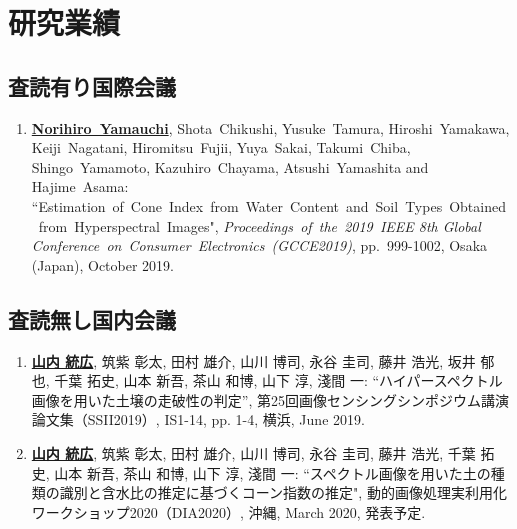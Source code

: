 \chapter*{研究業績}
\thispagestyle{empty}
\lhead[研究業績]{}
\label{achive}

\newpage


\section*{査読有り国際会議}
\mbox{}

\begin{enumerate}

\item
\underline{\textbf{Norihiro~Yamauchi}}, Shota~Chikushi, Yusuke~Tamura, Hiroshi~Yamakawa, Keiji~Nagatani, Hiromitsu~Fujii, Yuya~Sakai, Takumi~Chiba, Shingo~Yamamoto, Kazuhiro~Chayama, Atsushi~Yamashita and Hajime~Asama: ``Estimation~of~Cone~Index~from~Water~Content~and~Soil~Types~Obtained~from~Hyperspectral~Images", {\it Proceedings~of~the~2019~IEEE 8th Global Conference~on~Consumer~Electronics~(GCCE2019)}, pp.~999-1002, Osaka (Japan), October 2019.

\end{enumerate}


\section*{査読無し国内会議}
\mbox{}

\begin{enumerate}

\item
\underline{\textbf{山内 統広}}, 筑紫 彰太, 田村 雄介, 山川 博司, 永谷 圭司,  藤井 浩光, 坂井 郁也, 千葉 拓史, 山本 新吾, 茶山 和博, 山下 淳, 淺間 一: ``ハイパースペクトル画像を用いた土壌の走破性の判定”, 第25回画像センシングシンポジウム講演論文集（SSII2019）, IS1-14, pp. 1-4, 横浜, June 2019.
\\

\item
\underline{\textbf{山内 統広}}, 筑紫 彰太, 田村 雄介, 山川 博司, 永谷 圭司,  藤井 浩光, 千葉 拓史, 山本 新吾, 茶山 和博, 山下 淳, 淺間 一: ``スペクトル画像を用いた土の種類の識別と含水比の推定に基づくコーン指数の推定", 動的画像処理実利用化ワークショップ2020（DIA2020）, 沖縄, March 2020, 発表予定.

\end{enumerate}



